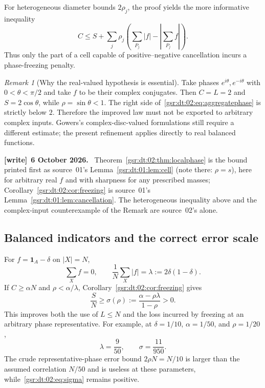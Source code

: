 \documentclass[11pt,letterpaper]{article}
\numberwithin{equation}{section}
\theoremstyle{definition}
\theoremstyle{remark}
\newtheorem{remark}[theorem]{Remark}
\newcommand{\one}{\mathbf 1}
\newcommand{\1}{\mathbf 1}
\newenvironment{writenote}[1][]{\par\smallskip\begingroup\small
 \noindent\textbf{[write]}\if\relax\detokenize{#1}\relax\else~\textbf{#1.}\fi\ }%
 {\par\endgroup\smallskip}
\begin{document}
For heterogeneous diameter bounds $2\rho_j$, the proof yields the more informative inequality
\[
 C\leq S+\sum_j\rho_j\left(\sum_{P_j}|f|-\left|\sum_{P_j}f\right|\right).
\]
Thus only the part of a cell capable of positive--negative cancellation incurs a phase-freezing penalty.

\begin{remark}[Why the real-valued hypothesis is essential]
Take phases $e^{i\theta},e^{-i\theta}$ with $0<\theta<\pi/2$ and take $f$ to be their complex conjugates. Then $C=L=2$ and $S=2\cos\theta$, while $\rho=\sin\theta<1$. The right side of~\eqref{gsr:dt:02:eq:aggregatephase} is strictly below $2$. Therefore the improved law must not be exported to arbitrary complex inputs. Gowers's complex-disc-valued formulations still require a different estimate; the present refinement applies directly to real balanced functions.
\end{remark}
\begin{writenote}[6 October 2026]
Theorem~\ref{gsr:dt:02:thm:localphase} is the bound printed first as source~01's Lemma~\ref{gsr:dt:01:lem:cell} (note there: $\rho=s$), here for arbitrary real $f$ and with sharpness for any prescribed masses; Corollary~\ref{gsr:dt:02:cor:freezing} is source~01's Lemma~\ref{gsr:dt:01:lem:cancellation}. The heterogeneous inequality above and the complex-input counterexample of the Remark are source~02's alone.
\end{writenote}

\subsection{Balanced indicators and the correct error scale}
For $f=\one_A-\delta$ on $|X|=N$,
\begin{equation}\label{gsr:dt:02:eq:balancedL1}
 \sum_Xf=0,\qquad \frac1N\sum_X|f|=\lambda:=2\delta(1-\delta).
\end{equation}
If $C\geq\alpha N$ and $\rho<\alpha/\lambda$, Corollary~\ref{gsr:dt:02:cor:freezing} gives
\begin{equation}\label{gsr:dt:02:eq:sigma}
 \frac SN\geq\sigma(\rho):=\frac{\alpha-\rho\lambda}{1-\rho}>0.
\end{equation}
This improves both the use of $L\leq N$ and the loss incurred by freezing at an arbitrary phase representative. For example, at $\delta=1/10$, $\alpha=1/50$, and $\rho=1/20$,
\[
 \lambda=\frac9{50},\qquad \sigma=\frac{11}{950}.
\]
The crude representative-phase error bound $2\rho N=N/10$ is larger than the assumed correlation $N/50$ and is useless at these parameters, while~\eqref{gsr:dt:02:eq:sigma} remains positive.
\end{document}

